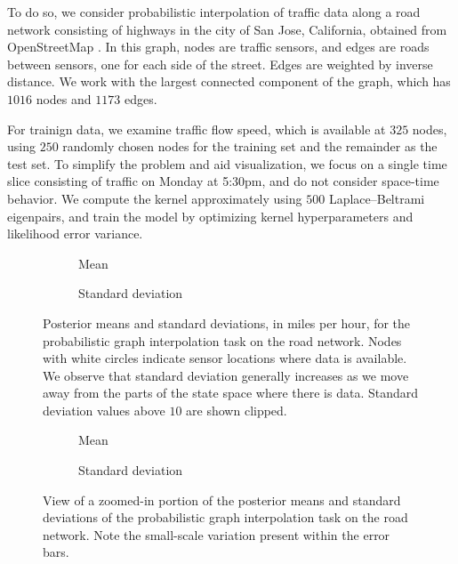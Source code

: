 \documentclass[11pt]{book}
\begin{document}
To do so, we consider probabilistic interpolation of traffic data along a road network consisting of highways in the city of San Jose, California, obtained from OpenStreetMap \cite{osm17}.
In this graph, nodes are traffic sensors, and edges are roads between sensors, one for each side of the street.
Edges are weighted by inverse distance.
We work with the largest connected component of the graph, which has $1016$ nodes and $1173$ edges.

For trainign data, we examine traffic flow speed, which is available at $325$ nodes, using $250$ randomly chosen nodes for the training set and the remainder as the test set.
To simplify the problem and aid visualization, we focus on a single time slice consisting of traffic on Monday at 5:30pm, and do not consider space-time behavior.
We compute the kernel approximately using $500$ Laplace--Beltrami eigenpairs, and train the model by optimizing kernel hyperparameters and likelihood error variance.

\begin{figure}
\begin{subfigure}{0.49\textwidth}

\caption{Mean}
\end{subfigure}
\begin{subfigure}{0.49\textwidth}

\caption{Standard deviation}
\end{subfigure}
\caption{Posterior means and standard deviations, in miles per hour, for the probabilistic graph interpolation task on the road network. Nodes with white circles indicate sensor locations where data is available. We observe that standard deviation generally increases as we move away from the parts of the state space where there is data. Standard deviation values above $10$ are shown clipped. }
\label{fig:graph-posterior}
\end{figure}

\begin{figure}
\begin{subfigure}{0.49\textwidth}

\caption{Mean}
\end{subfigure}
\begin{subfigure}{0.49\textwidth}

\caption{Standard deviation}
\end{subfigure}
\caption{View of a zoomed-in portion of the posterior means and standard deviations of the probabilistic graph interpolation task on the road network. Note the small-scale variation present within the error bars.}
\label{fig:graph-posterior-zoom}
\end{figure}
\end{document}
